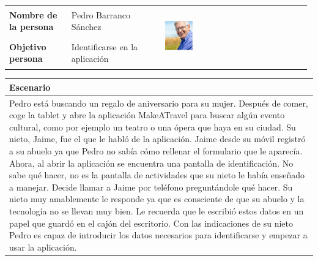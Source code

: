 \documentclass[11pt]{article}
\begin{document}
\begin{table}[H]
  \centering
  \begin{tabular}{p{0.2\linewidth}|p{0.3\linewidth}p{0.475\linewidth}}
    \toprule
    \textbf{Nombre de la persona} & Pedro Barranco Sánchez &\multirow{2}{*}{\begin{minipage}{1.\textwidth}\includegraphics[width=0.2\textwidth, height=25mm]{Pedro}\end{minipage}}\\
    \textbf{Objetivo persona} & Identificarse en la aplicación & \\
    \bottomrule
  \end{tabular}

\begin{tabular}{p{1.028\linewidth}}
  \textbf{Escenario}\\
  \midrule
  Pedro está buscando un regalo de aniversario para su mujer. Después de comer, coge la tablet y abre la aplicación MakeATravel para buscar algún evento cultural, como por ejemplo un teatro o una ópera que haya en su ciudad. Su nieto, Jaime, fue el que le habló de la aplicación. Jaime desde su móvil registró a su abuelo ya que Pedro no sabía cómo rellenar el formulario que le aparecía. Ahora, al abrir la aplicación se encuentra una pantalla de identificación. No sabe qué hacer, no es la pantalla de actividades que su nieto le había enseñado a manejar. Decide llamar a Jaime por teléfono preguntándole qué hacer. Su nieto muy amablemente le responde ya que es consciente de que su abuelo y la tecnología no se llevan muy bien. Le recuerda que le escribió estos datos en un papel que guardó en el cajón del escritorio. Con las indicaciones de su nieto Pedro es capaz de introducir los datos necesarios para identificarse y empezar a usar la aplicación.

\end{tabular}
\end{table}
\end{document}
